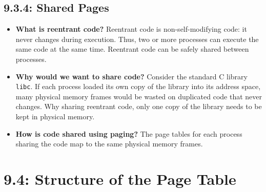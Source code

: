 \documentclass[12pt]{article}
\begin{document}
\subsection*{9.3.4: Shared Pages}

\begin{itemize}
    \item \textbf{What is reentrant code?} Reentrant code is non-self-modifying code: it never changes during execution. Thus, two or more processes can execute the same code at the same time. Reentrant code can be safely shared between processes.
    \item \textbf{Why would we want to share code?} Consider the standard C library \texttt{libc}. If each process loaded its own copy of the library into its address space, many physical memory frames would be wasted on duplicated code that never changes. Why sharing reentrant code, only one copy of the library needs to be kept in physical memory.
    \item \textbf{How is code shared using paging?} The page tables for each process sharing the code map to the same physical memory frames.
\end{itemize}

\section*{9.4: Structure of the Page Table}
\end{document}
